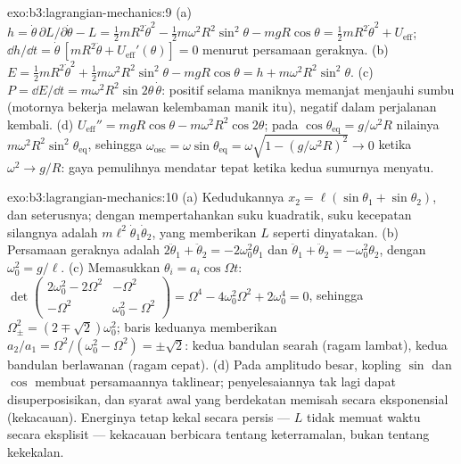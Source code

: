 \begin{solution}{exo:b3:lagrangian-mechanics:9}
(a) $h = \dot\theta\,\partial L/\partial\dot\theta - L = \tfrac12
mR^2\dot\theta^2 - \tfrac12 m\omega^2R^2\sin^2\theta - mgR\cos\theta =
\tfrac12 mR^2\dot\theta^2 + U_{\text{eff}}$; $\dd h/\dd t =
\dot\theta\,[mR^2\ddot\theta + U_{\text{eff}}'(\theta)] = 0$ menurut
persamaan geraknya. (b) $E = \tfrac12 mR^2\dot\theta^2 + \tfrac12
m\omega^2R^2\sin^2\theta - mgR\cos\theta = h +
m\omega^2R^2\sin^2\theta$. (c) $P = \dd E/\dd t =
m\omega^2R^2\sin2\theta\,\dot\theta$: positif selama maniknya memanjat
menjauhi sumbu (motornya bekerja melawan kelembaman manik itu), negatif
dalam perjalanan kembali. (d) $U_{\text{eff}}'' = mgR\cos\theta -
m\omega^2R^2\cos2\theta$; pada $\cos\theta_{\text{eq}} = g/\omega^2R$
nilainya $m\omega^2R^2\sin^2\theta_{\text{eq}}$, sehingga
$\omega_{\text{osc}} = \omega\sin\theta_{\text{eq}} = \omega\sqrt{1 -
(g/\omega^2R)^2} \to 0$ ketika $\omega^2 \to g/R$: gaya pemulihnya
mendatar tepat ketika kedua sumurnya menyatu.
\end{solution}

\begin{solution}{exo:b3:lagrangian-mechanics:10}
(a) Kedudukannya $x_2 = \ell(\sin\theta_1 + \sin\theta_2)$, dan
seterusnya; dengan mempertahankan suku kuadratik, suku kecepatan
silangnya adalah $m\ell^2\dot\theta_1\dot\theta_2$, yang memberikan $L$
seperti dinyatakan. (b) Persamaan geraknya adalah
$2\ddot\theta_1 + \ddot\theta_2 = -2\omega_0^2\theta_1$ dan
$\ddot\theta_1 + \ddot\theta_2 = -\omega_0^2\theta_2$,
dengan $\omega_0^2 = g/\ell$. (c) Memasukkan $\theta_i = a_i\cos\Omega t$:
$\det\begin{pmatrix} 2\omega_0^2 - 2\Omega^2 & -\Omega^2\\ -\Omega^2 &
\omega_0^2 - \Omega^2\end{pmatrix} = \Omega^4 - 4\omega_0^2\Omega^2 +
2\omega_0^4 = 0$, sehingga $\Omega_\pm^2 = (2 \mp \sqrt2)\omega_0^2$;
baris keduanya memberikan $a_2/a_1 = \Omega^2/(\omega_0^2 - \Omega^2) =
\pm\sqrt2$: kedua bandulan searah (ragam lambat), kedua bandulan
berlawanan (ragam cepat). (d) Pada amplitudo besar, kopling $\sin$ dan
$\cos$ membuat persamaannya taklinear; penyelesaiannya tak lagi dapat
disuperposisikan, dan syarat awal yang berdekatan memisah secara
eksponensial (kekacauan). Energinya tetap kekal secara persis --- $L$
tidak memuat waktu secara eksplisit --- kekacauan berbicara tentang
keterramalan, bukan tentang kekekalan.
\end{solution}

